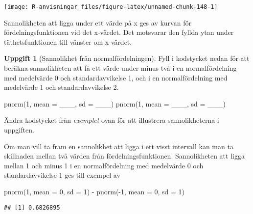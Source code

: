 \documentclass[
]{book}
\newenvironment{Shaded}{\begin{snugshade}}{\end{snugshade}}
\newcommand{\AttributeTok}[1]{\textcolor[rgb]{0.77,0.63,0.00}{#1}}
\newcommand{\DecValTok}[1]{\textcolor[rgb]{0.00,0.00,0.81}{#1}}
\newcommand{\FunctionTok}[1]{\textcolor[rgb]{0.00,0.00,0.00}{#1}}
\newcommand{\NormalTok}[1]{#1}
\newcommand{\SpecialCharTok}[1]{\textcolor[rgb]{0.00,0.00,0.00}{#1}}
\theoremstyle{definition}
\theoremstyle{definition}
\theoremstyle{definition}
\newtheorem{exercise}{Uppgift}[chapter]
\theoremstyle{definition}
\theoremstyle{remark}
\begin{document}
\begin{center}\texttt{[image: R-anvisningar\_files/figure-latex/unnamed-chunk-148-1]} \end{center}

Sannolikheten att ligga under ett värde på x ges av kurvan för fördelningsfunktionen vid det x-värdet. Det motsvarar den fyllda ytan under täthetsfunktionen till vänster om x-värdet.

\begin{exercise}[Sannolikhet från normalfördelningen]
Fyll i kodstycket nedan för att beräkna sannolikheten att få ett värde under minus två i en normalfördelning med medelvärde 0 och standardavvikelse 1, och i en normalfördelning med medelvärde 1 och standardavvikelse 2.

\begin{Shaded}
\begin{Highlighting}[]
\FunctionTok{pnorm}\NormalTok{(}\DecValTok{1}\NormalTok{, }\AttributeTok{mean =}\NormalTok{ \_\_\_, }\AttributeTok{sd =}\NormalTok{ \_\_\_)}
\FunctionTok{pnorm}\NormalTok{(}\DecValTok{1}\NormalTok{, }\AttributeTok{mean =}\NormalTok{ \_\_\_, }\AttributeTok{sd =}\NormalTok{ \_\_\_)}
\end{Highlighting}
\end{Shaded}

Ändra kodstycket från \emph{exemplet} ovan för att illustrera sannolikheterna i uppgiften.
\end{exercise}

Om man vill ta fram en sannolikhet att ligga i ett visst intervall kan man ta skillnaden mellan två värden från fördelningsfunktionen. Sannolikheten att ligga mellan 1 och minus 1 i en normalfördelning med medelvärde 0 och standardavvikelse 1 ges till exempel av

\begin{Shaded}
\begin{Highlighting}[]
\FunctionTok{pnorm}\NormalTok{(}\DecValTok{1}\NormalTok{, }\AttributeTok{mean =} \DecValTok{0}\NormalTok{, }\AttributeTok{sd =} \DecValTok{1}\NormalTok{) }\SpecialCharTok{{-}} \FunctionTok{pnorm}\NormalTok{(}\SpecialCharTok{{-}}\DecValTok{1}\NormalTok{, }\AttributeTok{mean =} \DecValTok{0}\NormalTok{, }\AttributeTok{sd =} \DecValTok{1}\NormalTok{)}
\end{Highlighting}
\end{Shaded}

\begin{verbatim}
## [1] 0.6826895
\end{verbatim}
\end{document}
